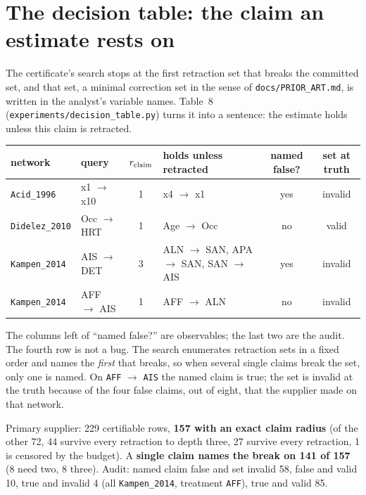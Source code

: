 \begin{antes}
\end{antes}

\section{The decision table: the claim an estimate rests on}\label{sec:frame-decision}

The certificate's search stops at the first retraction set that breaks the committed set, and that
set, a minimal correction set in the sense of \texttt{docs/PRIOR\_ART.md}, is written in the analyst's
variable names. Table~8 (\texttt{experiments/decision\_table.py}) turns it into a sentence: the
estimate holds unless this claim is retracted.

\begin{center}
\small
\begin{tabular}{@{}llc>{\raggedright\arraybackslash}p{4.4cm}cc@{}}
\toprule
network & query & $r_{\mathrm{claim}}$ & holds unless retracted & named false? & set at truth \\
\midrule
\texttt{Acid\_1996} & x1 $\to$ x10 & 1 & x4 $\to$ x1 & yes & invalid \\
\texttt{Didelez\_2010} & Occ $\to$ HRT & 1 & Age $\to$ Occ & no & valid \\
\texttt{Kampen\_2014} & AIS $\to$ DET & 3 & ALN $\to$ SAN, APA $\to$ SAN, SAN $\to$ AIS & yes & invalid \\
\texttt{Kampen\_2014} & AFF $\to$ AIS & 1 & AFF $\to$ ALN & no & invalid \\
\bottomrule
\end{tabular}
\end{center}

The columns left of ``named false?'' are observables; the last two are the audit. The fourth row is
not a bug. The search enumerates retraction sets in a fixed order and names the \emph{first} that
breaks, so when several single claims break the set, only one is named. On \texttt{AFF} $\to$
\texttt{AIS} the named claim is true; the set is invalid at the truth because of the four false claims,
out of eight, that the supplier made on that network.

\begin{medido}
Primary supplier: 229 certifiable rows, \textbf{157 with an exact claim radius} (of the other 72, 44
survive every retraction to depth three, 27 survive every retraction, 1 is censored by the budget).
A \textbf{single claim names the break on 141 of 157} (8 need two, 8 three). Audit: named claim false
and set invalid 58, false and valid 10, true and invalid 4 (all \texttt{Kampen\_2014}, treatment
\texttt{AFF}), true and valid 85.
\end{medido}

